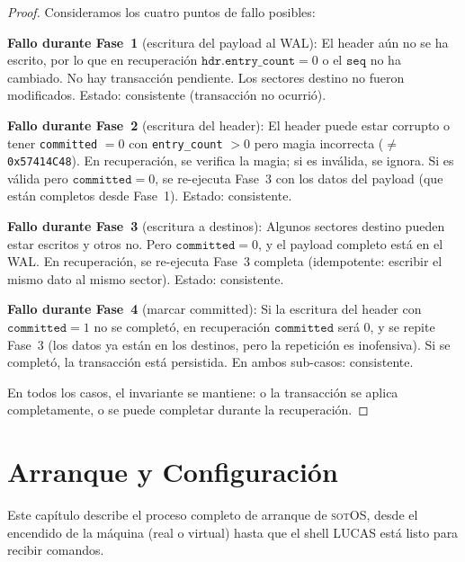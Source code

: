 \documentclass[11pt,twoside,openright]{book}
\theoremstyle{definition}
\theoremstyle{plain}
\theoremstyle{remark}
\newcommand{\sotos}{\textsc{sotOS}}
\begin{document}
\begin{proof}
Consideramos los cuatro puntos de fallo posibles:

\textbf{Fallo durante Fase~1} (escritura del payload al WAL): El header aún no
se ha escrito, por lo que en recuperación $\texttt{hdr.entry\_count} = 0$ o el
$\texttt{seq}$ no ha cambiado. No hay transacción pendiente. Los sectores
destino no fueron modificados. Estado: consistente (transacción no ocurrió).

\textbf{Fallo durante Fase~2} (escritura del header): El header puede estar
corrupto o tener \texttt{committed} $= 0$ con \texttt{entry\_count} $> 0$
pero magia incorrecta ($\neq$ \texttt{0x57414C48}). En recuperación, se
verifica la magia; si es inválida, se ignora. Si es válida pero
$\texttt{committed} = 0$, se re-ejecuta Fase~3 con los datos del payload
(que están completos desde Fase~1). Estado: consistente.

\textbf{Fallo durante Fase~3} (escritura a destinos): Algunos sectores
destino pueden estar escritos y otros no. Pero $\texttt{committed} = 0$,
y el payload completo está en el WAL. En recuperación, se re-ejecuta Fase~3
completa (idempotente: escribir el mismo dato al mismo sector). Estado: consistente.

\textbf{Fallo durante Fase~4} (marcar committed): Si la escritura del header
con $\texttt{committed} = 1$ no se completó, en recuperación
$\texttt{committed}$ será 0, y se repite Fase~3 (los datos ya están en los
destinos, pero la repetición es inofensiva). Si se completó, la transacción
está persistida. En ambos sub-casos: consistente.

En todos los casos, el invariante se mantiene: o la transacción se aplica
completamente, o se puede completar durante la recuperación. \qedhere
\end{proof}

\chapter{Arranque y Configuración}
\label{chap:arranque}

Este capítulo describe el proceso completo de arranque de \sotos{}, desde el
encendido de la máquina (real o virtual) hasta que el shell LUCAS está listo
para recibir comandos.

\end{document}
